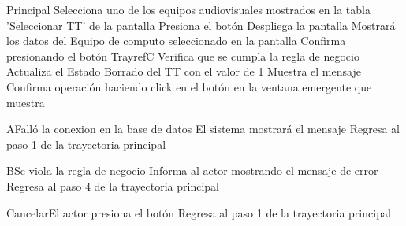 
\begin{UCtrayectoria}{Principal}
		\UCpaso[\UCactor] Selecciona uno de los equipos audiovisuales mostrados en la tabla 'Seleccionar TT' de la pantalla 
		\UCpaso[\UCactor] Presiona el botón 
		\UCpaso[\UCsist] Despliega la pantalla 
		\UCpaso[\UCsist] Mostrará los datos del Equipo de computo seleccionado en la pantalla
		\UCpaso[\UCactor] Confirma presionando el botón Trayref{C}
		\UCpaso[\UCsist] Verifica que se cumpla la regla de negocio  
		\UCpaso[\UCactor] Actualiza el Estado Borrado del TT con el valor de 1 
		\UCpaso[\UCsist] Muestra el mensaje 
		\UCpaso[\UCactor] Confirma operación haciendo click en el botón  en la ventana emergente que muestra
\end{UCtrayectoria}




\begin{UCtrayectoriaA}{A}{Falló la conexion en la base de datos}
			\UCpaso[\UCsist] El sistema mostrará el mensaje 
			\UCpaso[\UCsist] Regresa al paso 1 de la trayectoria principal 
\end{UCtrayectoriaA}


\begin{UCtrayectoriaA}{B}{Se viola la regla de negocio }	
			\UCpaso[\UCsist] Informa al actor mostrando el mensaje de error 
			\UCpaso[\UCsist] Regresa al paso 4 de la trayectoria principal 
\end{UCtrayectoriaA}



\begin{UCtrayectoriaA}{Cancelar}{El actor presiona el botón }
			\UCpaso[\UCsist] Regresa al paso 1 de la trayectoria principal  
\end{UCtrayectoriaA}